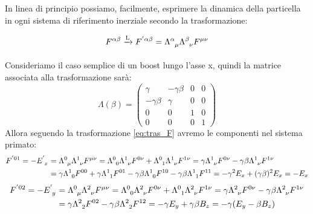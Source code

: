In linea di principio possiamo, facilmente, esprimere la dinamica della particella in ogni sistema di riferimento inerziale secondo la trasformazione:

\begin{equation} \label{eq:tras_F}
    F\indices{^{\alpha\beta}}
   \xrightarrow[\text{}]{\text{L}}
    F\indices{^'^{\alpha\beta}}
    =\Lambda\indices{^\alpha_\mu}
    \Lambda\indices{^\beta_\nu}
    F\indices{^{\mu\nu}}
\end{equation}

Consideriamo il caso semplice di un boost lungo l'asse x, quindi la matrice associata alla trasformazione sarà:
\begin{equation}
\Lambda(\beta)=
\begin{pmatrix}
\gamma & -\gamma\beta & 0 & 0   \\
 -\gamma\beta &\gamma & 0 & 0    \\
  0 & 0 & 1 & 0                   \\
  0 & 0 & 0 & 1
\end{pmatrix}
\end{equation}
Allora seguendo la trasformazione \eqref{eq:tras_F} avremo le componenti nel sistema primato:
\begin{equation*}
    \begin{split}
         F\indices{^'^{01}}=-E\indices{^'_x}
    &=
    \Lambda\indices{^0_\mu}
    \Lambda\indices{^1_\nu}
    F\indices{^{\mu\nu}}=\Lambda\indices{^0_0}
    \Lambda\indices{^1_\nu}
    F\indices{^{0\nu}}+\Lambda\indices{^0_1}
    \Lambda\indices{^1_\nu}
    F\indices{^{1\nu}}=\gamma
    \Lambda\indices{^1_\nu}
    F\indices{^{0\nu}}-\gamma\beta
    \Lambda\indices{^1_\nu}
    F\indices{^{1\nu}}
    \\
    &=\gamma
    \Lambda\indices{^1_0}
    F\indices{^{00}}+\gamma
    \Lambda\indices{^1_1}
    F\indices{^{01}}-\gamma\beta
    \Lambda\indices{^1_0}
    F\indices{^{10}}-\gamma\beta
    \Lambda\indices{^1_1}
    F\indices{^{11}}=
    -\gamma^2
   E_x+(\gamma\beta)^2E_x=-E_x
    \end{split}
\end{equation*}
\begin{equation*}
    \begin{split}
         F\indices{^'^{02}}=-E\indices{^'_y}
    &=
    \Lambda\indices{^0_\mu}
    \Lambda\indices{^2_\nu}
    F\indices{^{\mu\nu}}=\Lambda\indices{^0_0}
    \Lambda\indices{^2_\nu}
    F\indices{^{0\nu}}+\Lambda\indices{^0_1}
    \Lambda\indices{^2_\nu}
    F\indices{^{1\nu}}=\gamma
    \Lambda\indices{^2_\nu}
    F\indices{^{0\nu}}-\gamma\beta
    \Lambda\indices{^2_\nu}
    F\indices{^{1\nu}}
    \\
    &=\gamma
    \Lambda\indices{^2_2}
    F\indices{^{02}}-\gamma\beta
    \Lambda\indices{^2_2}
    F\indices{^{12}}=-\gamma
   E_y+\gamma\beta B_z=-\gamma( E_y-\beta B_z)
    \end{split}
\end{equation*}
